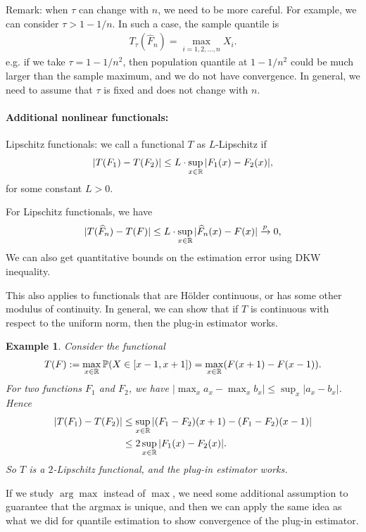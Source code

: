 \documentclass[11pt,letterpaper]{article}
\numberwithin{assumption}{lecture}
\newtheorem{example}{Example}
\numberwithin{theorem}{lecture}
\numberwithin{proposition}{lecture}
\numberwithin{lemma}{lecture}
\numberwithin{claim}{lecture}
\numberwithin{corollary}{lecture}
\numberwithin{definition}{lecture}
\numberwithin{conjecture}{lecture}
\numberwithin{remark}{lecture}
\numberwithin{example}{lecture}
\numberwithin{equation}{lecture}
\begin{document}
Remark: when $\tau$ can change with $n$, we need to be more careful. For example, we can consider $\tau > 1 - 1/n$. In such a case, the sample quantile is
\begin{align*}
  T_\tau (\widehat{F}_n) = \max_{i=1, 2, \ldots, n} X_i.
\end{align*}
e.g. if we take $\tau = 1 - 1/n^2$, then population quantile at $1 - 1/n^2$ could be much larger than the sample maximum, and we do not have convergence. In general, we need to assume that $\tau$ is fixed and does not change with $n$.

\paragraph{Additional nonlinear functionals:}
Lipschitz functionals: we call a functional $T$ as $L$-Lipschitz if
\begin{align*}
  |T(F_1) - T(F_2)| \leq L \cdot \sup_{x \in \mathbb{R}} |F_1(x) - F_2(x)|,
\end{align*}
for some constant $L > 0$.

For Lipschitz functionals, we have
\begin{align*}
  |T(\widehat{F}_n) - T(F)| \leq L \cdot \sup_{x \in \mathbb{R}} |\widehat{F}_n(x) - F(x)| \xrightarrow{p} 0,
\end{align*}
We can also get quantitative bounds on the estimation error using DKW inequality.

This also applies to functionals that are H\"{o}lder continuous, or has some other modulus of continuity. In general, we can show that if $T$ is continuous with respect to the uniform norm, then the plug-in estimator works.

\begin{example}\upshape
  Consider the functional
  \begin{align*}
    T (F) := \max_{x \in \mathbb{R}} {\mathbb{P}} (X \in [x - 1, x + 1]) = \max_{x \in \mathbb{R}} (F(x + 1) - F(x - 1)).
  \end{align*}
  For two functions $F_1$ and $F_2$, we have
  $|\max_x a_x - \max_x b_x| \leq \sup_x |a_x-b_x|$. Hence
  \begin{align*}
    |T (F_1) - T (F_2)|
    &\leq \sup_{x \in \mathbb{R}} |(F_1-F_2)(x+1) - (F_1-F_2)(x-1)| \\
    &\leq 2 \sup_{x \in \mathbb{R}} |F_1(x) - F_2(x)|.
  \end{align*}
  So $T$ is a $2$-Lipschitz functional, and the plug-in estimator works.
\end{example}
If we study $\arg\max$ instead of $\max$, we need some additional assumption to guarantee that the argmax is unique, and then we can apply the same idea as what we did for quantile estimation to show convergence of the plug-in estimator.
\end{document}
